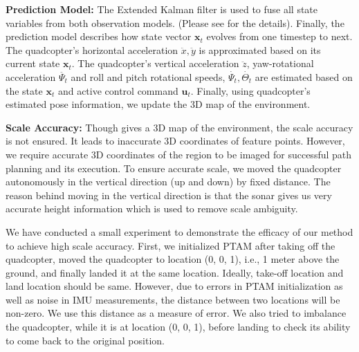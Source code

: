 \textbf{Prediction Model:} The Extended Kalman filter is used to fuse all state
variables from both observation models. (Please see \cite{engel} for the
details). Finally, the prediction model describes how state vector $\mathbf{x}_t$
evolves from one timestep to next. The quadcopter’s horizontal acceleration $\ddot{x}, \ddot{y}$ is
approximated based on its current state $\mathbf{x}_t$.
The quadcopter's vertical acceleration   $\ddot{z}$, yaw-rotational 
acceleration $\ddot{{\Psi}_t}$ and roll and pitch rotational speeds,
$\dot{{\Psi}_t}, \dot{{\Theta}_t}$ are estimated based on the state
$\mathbf{x}_t$ and  active control command $\mathbf{u}_t$. Finally, using quadcopter's 
estimated pose information, we update the 3D map of the environment.

\noindent\textbf{Scale Accuracy:} 
Though \cite{engel}  gives a 3D map of the environment, the scale accuracy is
not ensured. It leads to inaccurate 3D coordinates of feature points. However, we
require accurate 3D coordinates of the region to be imaged for successful path
planning and its execution. To ensure accurate scale, we moved the quadcopter autonomously in
the vertical direction (up and down) by fixed distance. The reason behind moving in
the vertical direction is that the sonar gives us very accurate height information 
which is used to remove scale ambiguity.

We have conducted a small experiment to demonstrate the efficacy of our method to
achieve high scale accuracy. First, we initialized PTAM after
taking off the quadcopter, moved the quadcopter to location (0, 0, 1), i.e., 1
meter above the ground, and finally landed it at the same location. Ideally,
take-off location and land location should be same. However, due to errors in
PTAM initialization as well as noise in IMU measurements, the distance between
two locations will be non-zero. We use this distance as a measure of error. We
also tried to imbalance the quadcopter, while it is at location (0, 0, 1),
before landing to check its ability to come back to the original position.

